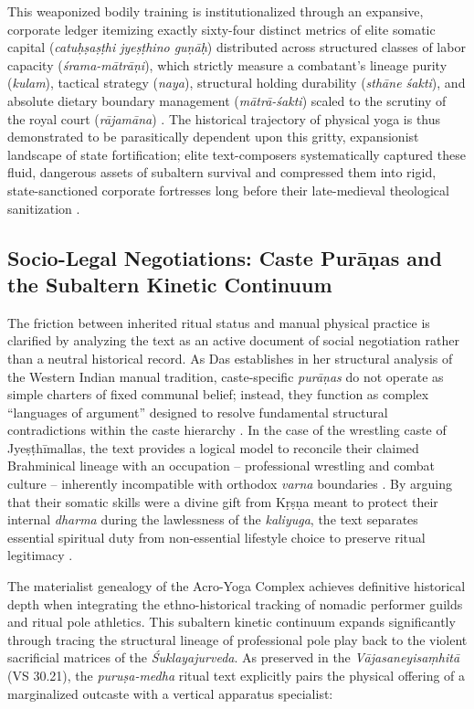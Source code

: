 \documentclass[11pt,twoside,letterpaper]{article}
\begin{document}
This weaponized bodily training is institutionalized through an expansive, corporate ledger itemizing exactly sixty-four distinct metrics of elite somatic capital (\textit{catuḥṣaṣṭhi jyeṣṭhino guṇāḥ}) distributed across structured classes of labor capacity (\textit{śrama-mātrāṇi}), which strictly measure a combatant's lineage purity (\textit{kulam}), tactical strategy (\textit{naya}), structural holding durability (\textit{sthāne śakti}), and absolute dietary boundary management (\textit{mātrā-śakti}) scaled to the scrutiny of the royal court (\textit{rājamāna}) \citep{MP_7, Olivelle2011}. The historical trajectory of physical yoga is thus demonstrated to be parasitically dependent upon this gritty, expansionist landscape of state fortification; elite text-composers systematically captured these fluid, dangerous assets of subaltern survival and compressed them into rigid, state-sanctioned corporate fortresses long before their late-medieval theological sanitization \citep{MP_7, kolff1971, kolff1990}.

\subsection{Socio-Legal Negotiations: Caste Purāṇas and the Subaltern Kinetic Continuum}

The friction between inherited ritual status and manual physical practice is clarified by analyzing the text as an active document of social negotiation rather than a neutral historical record. As Das establishes in her structural analysis of the Western Indian manual tradition, caste-specific \textit{purāṇas} do not operate as simple charters of fixed communal belief; instead, they function as complex ``languages of argument'' designed to resolve fundamental structural contradictions within the caste hierarchy \citep{Das1968}. In the case of the wrestling caste of Jyeṣṭhīmallas, the text provides a logical model to reconcile their claimed Brahminical lineage with an occupation -- professional wrestling and combat culture -- inherently incompatible with orthodox \textit{varna} boundaries \citep{Das1968}. By arguing that their somatic skills were a divine gift from Kṛṣṇa meant to protect their internal \textit{dharma} during the lawlessness of the \textit{kaliyuga}, the text separates essential spiritual duty from non-essential lifestyle choice to preserve ritual legitimacy \citep{Das1968}.

The materialist genealogy of the Acro-Yoga Complex achieves definitive historical depth when integrating the ethno-historical tracking of nomadic performer guilds and ritual pole athletics. This subaltern kinetic continuum expands significantly through tracing the structural lineage of professional pole play back to the violent sacrificial matrices of the \textit{Śuklayajurveda}. As preserved in the \textit{Vājasaneyisaṃhitā} (VS 30.21), the \textit{puruṣa-medha} ritual text explicitly pairs the physical offering of a marginalized outcaste with a vertical apparatus specialist: 
\end{document}

